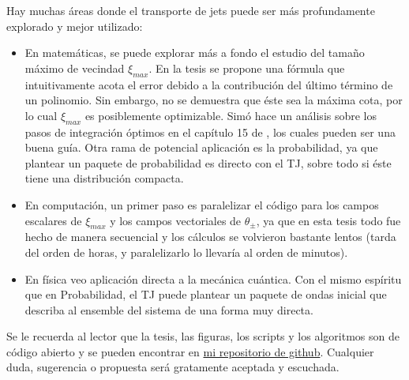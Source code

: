 Hay muchas áreas donde el transporte de jets puede ser más profundamente explorado y mejor utilizado: 
\begin{itemize}
\item En matemáticas, se puede explorar más a fondo el estudio del tamaño máximo de vecindad $\xi_{max}$. En la tesis se propone una fórmula que intuitivamente acota el error debido a la contribución del último término de un polinomio. Sin embargo, no se demuestra que éste sea la máxima cota, por lo cual $\xi_{max}$ es posiblemente optimizable. Simó hace un análisis sobre los pasos de integración óptimos en el capítulo 15 de \cite[Capítulo~15]{Simo2001}, los cuales pueden ser una buena guía. Otra rama de potencial aplicación es la probabilidad, ya que plantear un paquete de probabilidad es directo con el TJ, sobre todo si éste tiene una distribución compacta.

\item En computación, un primer paso es paralelizar el código para los campos escalares de $\xi_{max}$ y los campos vectoriales de $\theta_{\pm}$, ya que en esta tesis todo fue hecho de manera secuencial y los cálculos se volvieron bastante lentos (tarda del orden de horas, y paralelizarlo lo llevaría al orden de minutos). 

\item En física veo aplicación directa a la mecánica cuántica. Con el mismo espíritu que en Probabilidad, el TJ puede plantear un paquete de ondas inicial que describa al ensemble del sistema de una forma muy directa. 
\end{itemize}

Se le recuerda al lector que la tesis, las figuras, los scripts y los algoritmos son de código abierto y se pueden encontrar en \href{https://github.com/blas-ko/tesis}{mi repositorio de github}. Cualquier duda, sugerencia o propuesta será gratamente aceptada y escuchada.

